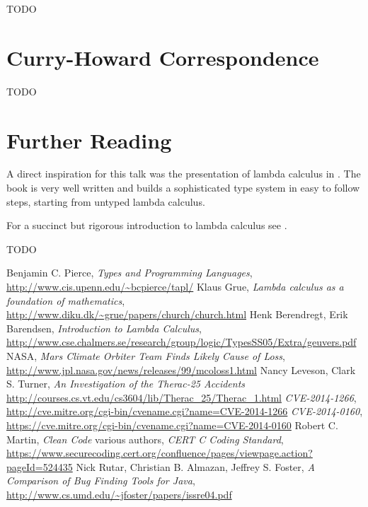 \documentclass[11pt,twoside,a4paper]{article} %
\begin{document}
TODO

\section{Curry-Howard Correspondence}

TODO

\section{Further Reading}

A direct inspiration for this talk was the presentation of lambda calculus in
\cite{TAPL}. The book is very well written and builds a sophisticated type
system in easy to follow steps, starting from untyped lambda calculus. 

For a succinct but rigorous introduction to lambda calculus see \cite{bb00}.

TODO

\begin{thebibliography}{9}
 Benjamin C. Pierce, \emph{Types and Programming Languages},
\url{http://www.cis.upenn.edu/~bcpierce/tapl/}
 Klaus Grue, \emph{Lambda calculus as a foundation of mathematics},
\url{http://www.diku.dk/~grue/papers/church/church.html}
 Henk Berendregt, Erik Barendsen, \emph{Introduction to Lambda
Calculus}, \url{http://www.cse.chalmers.se/research/group/logic/TypesSS05/Extra/geuvers.pdf}
 NASA, \emph{Mars Climate Orbiter Team Finds Likely Cause of Loss}, 
\url{http://www.jpl.nasa.gov/news/releases/99/mcoloss1.html}
 Nancy Leveson, Clark S. Turner, 
\emph{An Investigation of the Therac-25 Accidents}
\url{http://courses.cs.vt.edu/cs3604/lib/Therac_25/Therac_1.html}
 \emph{CVE-2014-1266},
\url{http://cve.mitre.org/cgi-bin/cvename.cgi?name=CVE-2014-1266}
 \emph{CVE-2014-0160}, 
\url{https://cve.mitre.org/cgi-bin/cvename.cgi?name=CVE-2014-0160}
 Robert C. Martin, \emph{Clean Code}
 various authors, \emph{CERT C Coding Standard}, 
\url{https://www.securecoding.cert.org/confluence/pages/viewpage.action?pageId=524435}
 Nick Rutar, Christian B. Almazan, Jeffrey S. Foster, \emph{A
Comparison of Bug Finding Tools for Java}, \url{http://www.cs.umd.edu/~jfoster/papers/issre04.pdf}
\end{thebibliography}
\end{document}

